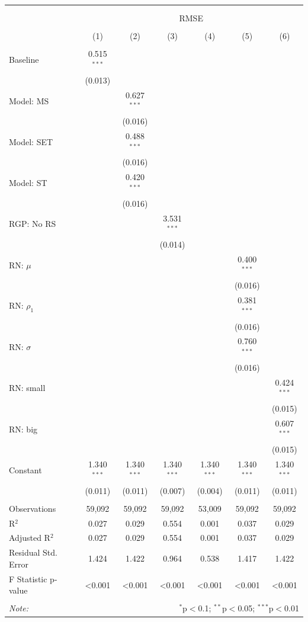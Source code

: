 \begin{tabular}{@{\extracolsep{5pt}}lcccccc} 
\\[-1.8ex]\hline 
\hline \\[-1.8ex] 
\\[-1.8ex] & \multicolumn{6}{c}{RMSE} \\ 
\\[-1.8ex] & (1) & (2) & (3) & (4) & (5) & (6)\\ 
\hline \\[-1.8ex] 
 Baseline & 0.515$^{***}$ &  &  &  &  &  \\ 
  & (0.013) &  &  &  &  &  \\ 
  Model: MS &  & 0.627$^{***}$ &  &  &  &  \\ 
  &  & (0.016) &  &  &  &  \\ 
  Model: SET &  & 0.488$^{***}$ &  &  &  &  \\ 
  &  & (0.016) &  &  &  &  \\ 
  Model: ST &  & 0.420$^{***}$ &  &  &  &  \\ 
  &  & (0.016) &  &  &  &  \\ 
  RGP: No RS &  &  & 3.531$^{***}$ &  &  &  \\ 
  &  &  & (0.014) &  &  &  \\ 
  RN: $\mu$ &  &  &  &  & 0.400$^{***}$ &  \\ 
  &  &  &  &  & (0.016) &  \\ 
  RN: $\rho_{1}$ &  &  &  &  & 0.381$^{***}$ &  \\ 
  &  &  &  &  & (0.016) &  \\ 
  RN: $\sigma$ &  &  &  &  & 0.760$^{***}$ &  \\ 
  &  &  &  &  & (0.016) &  \\ 
  RN: small &  &  &  &  &  & 0.424$^{***}$ \\ 
  &  &  &  &  &  & (0.015) \\ 
  RN: big &  &  &  &  &  & 0.607$^{***}$ \\ 
  &  &  &  &  &  & (0.015) \\ 
  Constant & 1.340$^{***}$ & 1.340$^{***}$ & 1.340$^{***}$ & 1.340$^{***}$ & 1.340$^{***}$ & 1.340$^{***}$ \\ 
  & (0.011) & (0.011) & (0.007) & (0.004) & (0.011) & (0.011) \\ 
 \hline \\[-1.8ex] 
Observations & 59,092 & 59,092 & 59,092 & 53,009 & 59,092 & 59,092 \\ 
R$^{2}$ & 0.027 & 0.029 & 0.554 & 0.001 & 0.037 & 0.029 \\ 
Adjusted R$^{2}$ & 0.027 & 0.029 & 0.554 & 0.001 & 0.037 & 0.029 \\ 
Residual Std. Error & 1.424 & 1.422 & 0.964 & 0.538 & 1.417 & 1.422 \\ 
F Statistic p-value & <0.001 & <0.001 & <0.001 & <0.001 & <0.001 & <0.001 \\ 
\hline 
\hline \\[-1.8ex] 
\textit{Note:}  & \multicolumn{6}{r}{$^{*}$p$<$0.1; $^{**}$p$<$0.05; $^{***}$p$<$0.01} \\ 
\end{tabular} 
